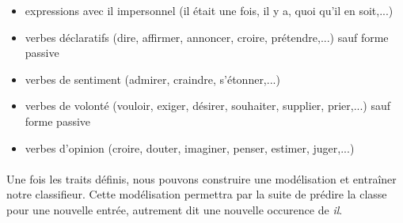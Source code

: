 \documentclass[a4paper,12pt]{article}
\begin{document}
\begin{itemize}
\begin{itemize}
  \item expressions avec il impersonnel (il était une fois, il y a, quoi qu'il en soit,...)
  \item verbes déclaratifs (dire, affirmer, annoncer, croire, prétendre,...) sauf forme passive
  \item verbes de sentiment (admirer, craindre, s'étonner,...)
  \item verbes de volonté (vouloir, exiger, désirer, souhaiter, supplier, prier,...) sauf forme passive
  \item verbes d'opinion (croire, douter, imaginer, penser, estimer, juger,...)
 \end{itemize}
\end{itemize}

% 
% 

\paragraph{}
Une fois les traits définis, nous pouvons construire une modélisation et entraîner notre classifieur. Cette modélisation permettra par la suite de prédire la classe pour une nouvelle entrée, autrement dit une nouvelle occurence de \og{}\textit{il}\fg{}.
\end{document}

